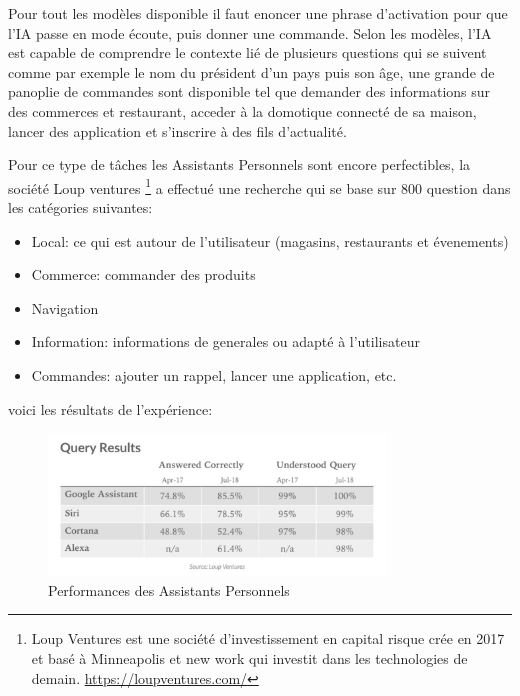 Pour tout les modèles disponible il faut enoncer une phrase d'activation pour que
l'IA passe en mode écoute, puis donner une commande. Selon les modèles, l'IA
est capable de comprendre le contexte lié de plusieurs questions qui se suivent
comme par exemple le nom du président d'un pays puis son âge, une grande de panoplie de
commandes sont disponible tel que demander des informations sur des commerces et restaurant,
acceder à la domotique connecté de sa maison, lancer des application et s'inscrire à des fils
d'actualité.

Pour ce type de tâches les Assistants Personnels sont encore perfectibles,
la société Loup ventures
\footnote{ Loup Ventures est une société d'investissement en capital risque crée en 2017 et
basé à Minneapolis et new work qui investit dans les technologies de demain. \newline
\url{https://loupventures.com/} }
a effectué une recherche qui se base sur 800 question dans les
catégories suivantes: \newline

\begin{itemize}
    \item Local: ce qui est autour de l'utilisateur (magasins, restaurants et évenements)
    \item Commerce: commander des produits
    \item Navigation
    \item Information: informations de generales ou adapté à l'utilisateur
    \item Commandes: ajouter un rappel, lancer une application, etc. \newline
\end{itemize}

voici les résultats de l'expérience:
\begin{figure}[h]
    \centering
    \includegraphics[width=0.8\textwidth]{Images/vaqueryresult}
    \caption{Performances des Assistants Personnels}
    \label{fig:virtualassistantqueryresult}
\end{figure}

